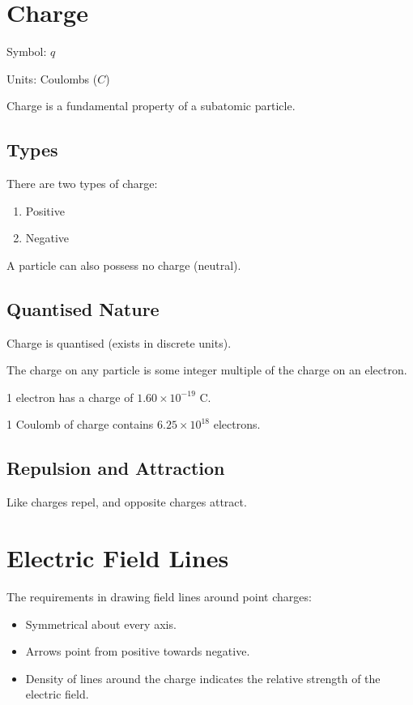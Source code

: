 \documentclass[a4paper,11pt]{report}
\begin{document}
\section{Charge}

Symbol: $q$

Units: Coulombs ($C$)

Charge is a fundamental property of a subatomic particle.

\subsection{Types}

There are two types of charge:

\begin{enumerate}
\item Positive
\item Negative
\end{enumerate}

A particle can also possess no charge (neutral).

\subsection{Quantised Nature}

Charge is quantised (exists in discrete units).

The charge on any particle is some integer multiple of the charge on an
electron.

1 electron has a charge of $1.60 \times 10^{-19}\mbox{ C}$.

1 Coulomb of charge contains $6.25 \times 10^{18}$ electrons.

\subsection{Repulsion and Attraction}

Like charges repel, and opposite charges attract.


\section{Electric Field Lines}

The requirements in drawing field lines around point charges:

\begin{itemize}
\item Symmetrical about every axis.
\item Arrows point from positive towards negative.
\item Density of lines around the charge indicates the relative strength of the
	electric field.
\end{itemize}
\end{document}

